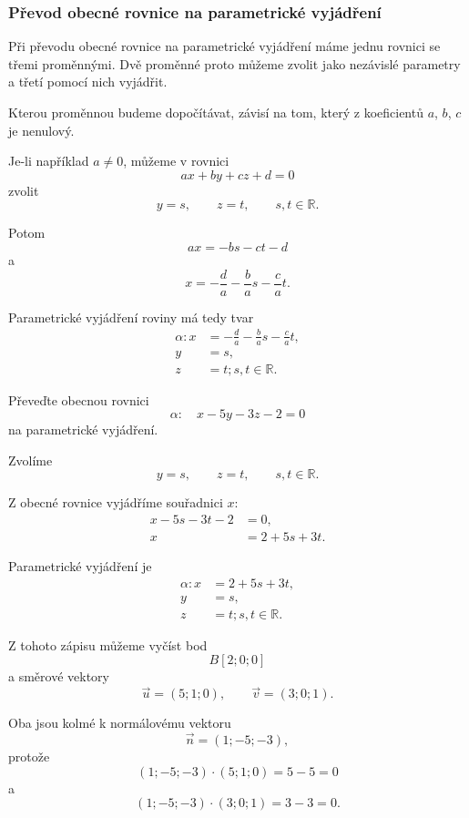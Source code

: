 \subsubsection{Převod obecné rovnice na parametrické vyjádření}
\label{subsubsec:General_to_parametric_plane}

Při převodu obecné rovnice na parametrické vyjádření máme jednu rovnici
se třemi proměnnými. Dvě proměnné proto můžeme zvolit jako nezávislé
parametry a třetí pomocí nich vyjádřit.

Kterou proměnnou budeme dopočítávat, závisí na tom, který z koeficientů
$a$, $b$, $c$ je nenulový.

Je-li například $a\neq0$, můžeme v rovnici
\[
    ax+by+cz+d=0
\]
zvolit
\[
    y=s,
    \qquad
    z=t,
    \qquad
    s,t\in\mathbb{R}.
\]

Potom
\[
    ax=-bs-ct-d
\]
a
\[
    x=-\frac{d}{a}-\frac{b}{a}s-\frac{c}{a}t.
\]

Parametrické vyjádření roviny má tedy tvar
\[
    \begin{aligned}
        \alpha: x&=-\frac{d}{a}-\frac{b}{a}s-\frac{c}{a}t,\\
        y&=s,\\
        z&=t; s,t\in\mathbb{R}.
    \end{aligned}
\]

\begin{example}
    \label{exa:General_to_parametric_plane}

    Převeďte obecnou rovnici
    \[
        \alpha:\quad x-5y-3z-2=0
    \]
    na parametrické vyjádření.

    Zvolíme
    \[
        y=s,
        \qquad
        z=t,
        \qquad
        s,t\in\mathbb{R}.
    \]

    Z obecné rovnice vyjádříme souřadnici $x$:
    \begin{align*}
        x-5s-3t-2&=0,\\
        x&=2+5s+3t.
    \end{align*}

    Parametrické vyjádření je
    \[
        \begin{aligned}
            \alpha: x&=2+5s+3t,\\
            y&=s,\\
            z&=t; s,t\in\mathbb{R}.
        \end{aligned}
    \]

    Z tohoto zápisu můžeme vyčíst bod
    \[
        B[2;0;0]
    \]
    a směrové vektory
    \[
        \vec{u}=(5;1;0),
        \qquad
        \vec{v}=(3;0;1).
    \]

    Oba jsou kolmé k normálovému vektoru
    \[
        \vec{n}=(1;-5;-3),
    \]
    protože
    \[
        (1;-5;-3)\cdot(5;1;0)=5-5=0
    \]
    a
    \[
        (1;-5;-3)\cdot(3;0;1)=3-3=0.
    \]
\end{example}

